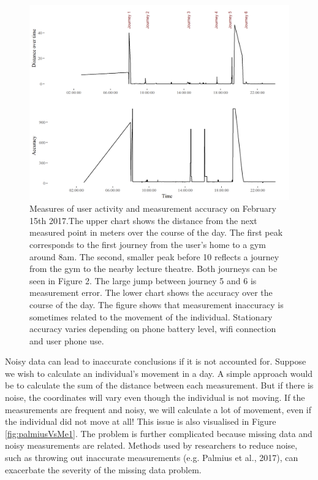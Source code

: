 \documentclass[man]{apa6}
\theoremstyle{definition}
\theoremstyle{definition}
\theoremstyle{definition}
\theoremstyle{remark}
\begin{document}
\begin{figure}
\includegraphics[width=1\linewidth]{img/accuracyLocShift} \caption{Measures of user activity and measurement accuracy on February 15th 2017.The upper chart shows the distance from the next measured point in meters over the course of the day. The first peak corresponds to the first journey from the user's home to a gym around 8am. The second, smaller peak before 10 reflects a journey from the gym to the nearby lecture theatre. Both journeys can be seen in Figure 2. The large jump between journey 5 and 6 is measurement error. The lower chart shows the accuracy over the course of the day. The figure shows that measurement inaccuracy is sometimes related to the movement of the individual. Stationary accuracy varies depending on phone battery level, wifi connection and user phone use.}\label{fig:accuracyPlot2}
\end{figure}

Noisy data can lead to inaccurate conclusions if it is not accounted
for. Suppose we wish to calculate an individual's movement in a day. A
simple approach would be to calculate the sum of the distance between
each measurement. But if there is noise, the coordinates will vary even
though the individual is not moving. If the measurements are frequent
and noisy, we will calculate a lot of movement, even if the individual
did not move at all! This issue is also visualised in Figure
\ref{fig:palmiusVsMe1}. The problem is further complicated because
missing data and noisy measurements are related. Methods used by
researchers to reduce noise, such as throwing out inaccurate
measurements (e.g. Palmius et al., 2017), can exacerbate the severity of
the missing data problem.
\end{document}
